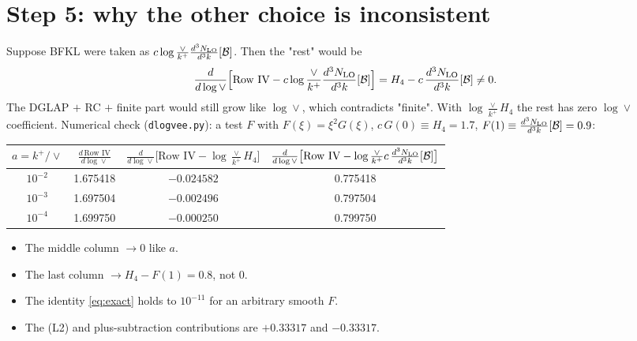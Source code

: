 \documentclass[10pt]{article}
\numberwithin{equation}{section}
\newcommand{\NLO}[1]{\frac{d^3N_{#1}}{d^3k}}
\begin{document}
\section{Step 5: why the other choice is inconsistent}
Suppose BFKL were taken as $c\log\frac{\vee}{k^+}\NLO{\rm LO}[\mathcal B]$. Then the "rest" would be
\begin{equation}
\frac{d}{d\log\vee}\Big[\text{Row IV}-c\log\frac{\vee}{k^+}\NLO{\rm LO}[\mathcal B]\Big]=H_4-c\,\NLO{\rm LO}[\mathcal B]\neq0 .
\end{equation}
The DGLAP $+$ RC $+$ finite part would still grow like $\log\vee$, which contradicts "finite". With $\log\frac{\vee}{k^+}H_4$ the rest has zero $\log\vee$ coefficient. Numerical check (\texttt{dlogvee.py}): a test $F$ with $F(\xi)=\xi^2G(\xi)$, $c\,G(0)\equiv H_4=1.7$, $F(1)\equiv\NLO{\rm LO}[\mathcal B]=0.9$:
\begin{center}
\begin{tabular}{@{}cccc@{}}\toprule
$a=k^+/\vee$ & $\frac{d\,\text{Row IV}}{d\log\vee}$ & $\frac{d}{d\log\vee}\big[\text{Row IV}-\log\frac{\vee}{k^+}H_4\big]$ & $\frac{d}{d\log\vee}\big[\text{Row IV}-\log\frac{\vee}{k^+}c\,\NLO{\rm LO}[\mathcal B]\big]$\\\midrule
$10^{-2}$ & 1.675418 & $-0.024582$ & 0.775418\\
$10^{-3}$ & 1.697504 & $-0.002496$ & 0.797504\\
$10^{-4}$ & 1.699750 & $-0.000250$ & 0.799750\\\bottomrule
\end{tabular}
\end{center}
\begin{itemize}
\item The middle column $\to0$ like $a$.
\item The last column $\to H_4-F(1)=0.8$, not 0.
\item The identity \eqref{eq:exact} holds to $10^{-11}$ for an arbitrary smooth $F$.
\item The (L2) and plus-subtraction contributions are $+0.33317$ and $-0.33317$.
\end{itemize}
\end{document}
